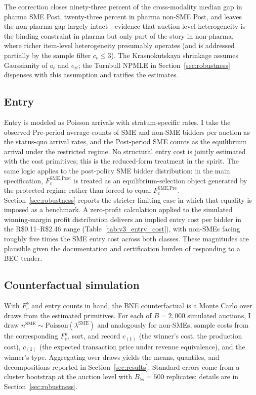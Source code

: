 The correction closes ninety-three percent of the cross-modality median gap in pharma SME Post, twenty-three percent in pharma non-SME Post, and leaves the non-pharma gap largely intact---evidence that auction-level heterogeneity is the binding constraint in pharma but only part of the story in non-pharma, where richer item-level heterogeneity presumably operates (and is addressed partially by the sample filter $c_\epsilon \le 3$). The Krasnokutskaya shrinkage assumes Gaussianity of $a_t$ and $e_{it}$; the Turnbull NPMLE in Section~\ref{sec:robustness} dispenses with this assumption and ratifies the estimates.

\subsection{Entry}

Entry is modeled as Poisson arrivals with stratum-specific rates. I take the observed Pre-period average counts of SME and non-SME bidders per auction as the status-quo arrival rates, and the Post-period SME counts as the equilibrium arrival under the restricted regime. No structural entry cost is jointly estimated with the cost primitives; this is the reduced-form treatment in the \citet{atheyseira2011} spirit. The same logic applies to the post-policy SME bidder distribution: in the main specification, $F_c^{\text{SME,Post}}$ is treated as an equilibrium-selection object generated by the protected regime rather than forced to equal $F_c^{\text{SME,Pre}}$. Section~\ref{sec:robustness} reports the stricter limiting case in which that equality is imposed as a benchmark. A zero-profit calculation applied to the simulated winning-margin profit distribution delivers an implied entry cost per bidder in the R\$0.11--R\$2.46 range (Table~\ref{tab:v3_entry_cost}), with non-SMEs facing roughly five times the SME entry cost across both classes. These magnitudes are plausible given the documentation and certification burden of responding to a BEC tender.

\subsection{Counterfactual simulation}

With $F_c^k$ and entry counts in hand, the BNE counterfactual is a Monte Carlo over draws from the estimated primitives. For each of $B = 2{,}000$ simulated auctions, I draw $n^{\text{SME}} \sim \mathrm{Poisson}(\lambda^{\text{SME}})$ and analogously for non-SMEs, sample costs from the corresponding $F_c^k$, sort, and record $c_{(1)}$ (the winner's cost, the production cost), $c_{(2)}$ (the expected transaction price under revenue equivalence), and the winner's type. Aggregating over draws yields the means, quantiles, and decompositions reported in Section~\ref{sec:results}. Standard errors come from a cluster bootstrap at the auction level with $B_{bs} = 500$ replicates; details are in Section~\ref{sec:robustness}.
